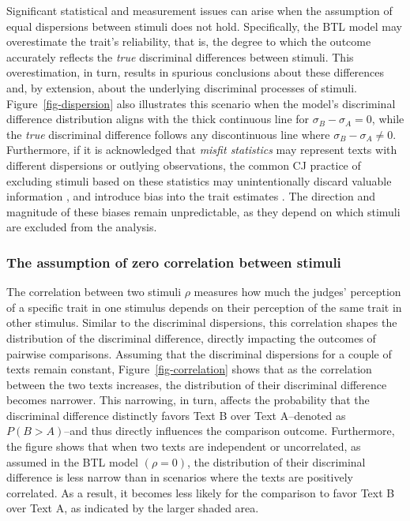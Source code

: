 \documentclass[
  authoryear,
  review,
  1p]{elsarticle}
\begin{document}
Significant statistical and measurement issues can arise when the
assumption of equal dispersions between stimuli does not hold.
Specifically, the BTL model may overestimate the trait's reliability,
that is, the degree to which the outcome accurately reflects the
\emph{true} discriminal differences between stimuli. This
overestimation, in turn, results in spurious conclusions about these
differences \citep{McElreath_2020, Wu_et_al_2022} and, by extension,
about the underlying discriminal processes of stimuli.
Figure~\ref{fig-dispersion} also illustrates this scenario when the
model's discriminal difference distribution aligns with the thick
continuous line for \(\sigma_{B}-\sigma_{A}=0\), while the \emph{true}
discriminal difference follows any discontinuous line where
\(\sigma_{B}-\sigma_{A} \neq 0\). Furthermore, if it is acknowledged
that \emph{misfit statistics} may represent texts with different
dispersions or outlying observations, the common CJ practice of
excluding stimuli based on these statistics may unintentionally discard
valuable information \citep{Miller_2023}, and introduce bias into the
trait estimates \citep{Zimmerman_1994, McElreath_2020}. The direction
and magnitude of these biases remain unpredictable, as they depend on
which stimuli are excluded from the analysis.

\subsubsection{The assumption of zero correlation between
stimuli}\label{sec-theory-issue1b}

The correlation between two stimuli \(\rho\) measures how much the
judges' perception of a specific trait in one stimulus depends on their
perception of the same trait in other stimulus. Similar to the
discriminal dispersions, this correlation shapes the distribution of the
discriminal difference, directly impacting the outcomes of pairwise
comparisons. Assuming that the discriminal dispersions for a couple of
texts remain constant, Figure~\ref{fig-correlation} shows that as the
correlation between the two texts increases, the distribution of their
discriminal difference becomes narrower. This narrowing, in turn,
affects the probability that the discriminal difference distinctly
favors Text B over Text A--denoted as \(P(B > A)\)--and thus directly
influences the comparison outcome. Furthermore, the figure shows that
when two texts are independent or uncorrelated, as assumed in the BTL
model \((\rho=0)\), the distribution of their discriminal difference is
less narrow than in scenarios where the texts are positively correlated.
As a result, it becomes less likely for the comparison to favor Text B
over Text A, as indicated by the larger shaded area.
\end{document}
